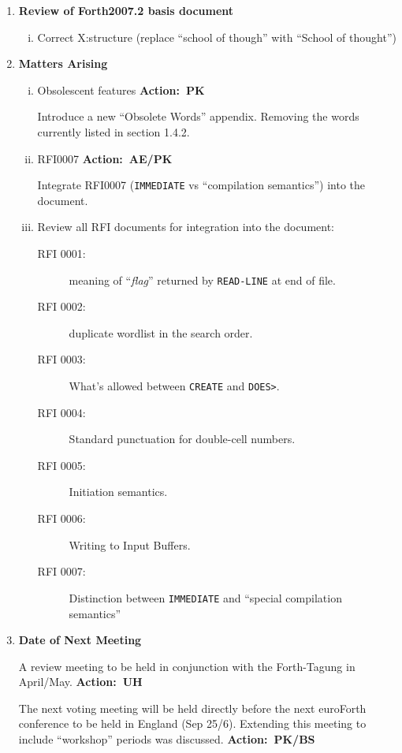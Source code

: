 \documentclass{article}
\newcommand{\action}[1]{%
	\mbox{}\hfill \textbf{Action:~#1}%
}
\newcommand{\word}[1]{\texttt{#1}}
\begin{document}
\begin{enumerate}[1. ]
\begin{enumerate}[a)]
\begin{enumerate}[i)]
	\item \textsf{Localisation:}
		Develop L10N proposals into RFD.
		\action{PK/SP}
	\end{enumerate}
\end{enumerate}

\item \textbf{Review of Forth2007.2 basis document}
	\begin{enumerate}[i)]
		\item Correct \textsf{X:structure} (replace ``school of though''
			with ``School of thought'')\\
	\end{enumerate}

\item \textbf{Matters Arising}
\begin{enumerate}[i)]
\item Obsolescent features \action{PK}

	Introduce a new ``Obsolete Words'' appendix.
	Removing the words currently listed in section 1.4.2.

\item RFI0007 \action{AE/PK}

	Integrate RFI0007 (\word{IMMEDIATE} vs ``compilation semantics'')
	into the document.

\item Review all RFI documents for integration into the document:
	\begin{description}
	\item[RFI 0001:]
		meaning of ``\emph{flag}'' returned by \word{READ-LINE}
		at end of file.
	\item[RFI 0002:]
		duplicate wordlist in the search order.
	\item[RFI 0003:]
		What's allowed between \word{CREATE} and \word{DOES>}.
	\item[RFI 0004:]
		Standard punctuation for double-cell numbers.
	\item[RFI 0005:]
		Initiation semantics.
	\item[RFI 0006:]
		Writing to Input Buffers.
	\item[RFI 0007:]
		Distinction between \word{IMMEDIATE} and ``special compilation
		semantics''
	\end{description}
\end{enumerate}

\item \textbf{Date of Next Meeting}

	A review meeting to be held in conjunction with the Forth-Tagung
	in April/May.
	\action{UH}

	The next voting meeting will be held directly before the next
	euroForth conference to be held in England (Sep 25/6).  Extending
	this meeting to include ``workshop'' periods was discussed.
	\action{PK/BS}
\end{enumerate}
\end{document}
